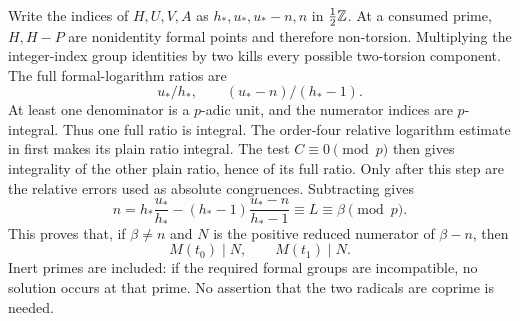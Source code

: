 \documentclass[11pt,a4paper]{article}
\begin{document}
Write the indices of $H,U,V,A$ as $h_*,u_*,u_*-n,n$ in
$\frac12\mathbb Z$. At a consumed prime, $H,H-P$ are nonidentity formal
points and therefore non-torsion. Multiplying the integer-index
group identities by two kills every possible two-torsion component.
The full formal-logarithm ratios are
\[
                u_*/h_*,\qquad (u_*-n)/(h_*-1).
\]
At least one denominator is a $p$-adic unit, and the numerator
indices are $p$-integral. Thus one full ratio is integral.
The order-four relative logarithm estimate in \cite{TraceAll}
first makes its plain ratio integral. The test $C\equiv0\pmod p$
then gives integrality of the other plain ratio, hence of its full
ratio. Only after this step are the relative errors used as absolute
congruences. Subtracting gives
\[
 n=h_*\frac{u_*}{h_*}-(h_*-1)\frac{u_*-n}{h_*-1}
          \equiv L\equiv\beta\pmod p.
\]
This proves that, if $\beta\ne n$ and $N$ is the positive reduced
numerator of $\beta-n$, then
\begin{equation}\label{eq:div}
                         M(t_0)\mid N,\qquad M(t_1)\mid N.
\end{equation}
Inert primes are included: if the required formal groups are
incompatible, no solution occurs at that prime. No assertion that
the two radicals are coprime is needed.
\end{document}
